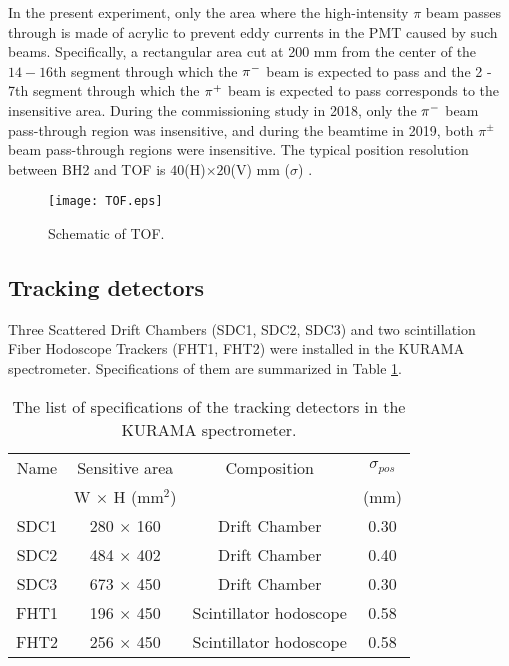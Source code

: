 In the present experiment, only the area where the high-intensity $\pi$ beam passes through is made of acrylic to prevent eddy currents in the PMT caused by such beams. 
Specifically, a rectangular area cut at 200 mm from the center of the $14-16$th segment through which the $\pi^{-}$ beam is expected to pass and the 2 - 7th segment through which the $\pi^{+}$ beam is expected to pass corresponds to the insensitive area. During the commissioning study in 2018, only the $\pi^{-}$ beam pass-through region was insensitive, and during the beamtime in 2019, both $\pi^{\pm}$ beam pass-through regions were insensitive. The typical position resolution between BH2 and TOF is $40$(H)$\times20$(V) mm ($\sigma$) \cite{Nana-D}. 

\begin{figure}[!h]
 \begin{center}
   \texttt{[image: TOF.eps]}
   \caption{Schematic of TOF.}
   \label{fig-TOF}
 \end{center}
\end{figure}

\subsection{Tracking detectors}
Three Scattered Drift Chambers (SDC1, SDC2, SDC3) and two scintillation Fiber Hodoscope Trackers (FHT1, FHT2) were installed in the KURAMA spectrometer. Specifications of them are summarized in Table \ref{tab-KURAMAspec-track}.

\begin{table}[h]
  \begin{center}
    \caption{The list of specifications of the tracking detectors in the KURAMA spectrometer.}
    \begin{tabular}{cccc}
      Name & Sensitive area & Composition & $\sigma_{pos}$ \\
       & W $\times$ H (mm$^2$) & & (mm) \\ \hline \hline
      SDC1& 280 $\times$ 160 & Drift Chamber & 0.30 \\
      SDC2& 484 $\times$ 402 & Drift Chamber & 0.40 \\
      SDC3 & 673 $\times$ 450 & Drift Chamber & 0.30 \\ 
      FHT1 & 196 $\times$ 450 & Scintillator hodoscope & 0.58 \\
      FHT2 & 256 $\times$ 450 & Scintillator hodoscope & 0.58 \\ 
   \end{tabular}
   \label{tab-KURAMAspec-track}
   \end{center}
\end{table}

